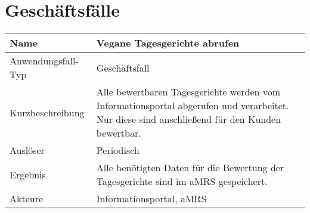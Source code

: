 \section{Geschäftsfälle}\label{sec:Geschaeftsfaelle}


\begin{table}[H]
    \centering
    \label{veganetagesgerichteabrufen}
    \begin{tabularx}{\textwidth}{| l | X |}
        \hline
        Name               & Vegane Tagesgerichte abrufen                                                                                                                  \\
        \hline
        Anwendungsfall-Typ & Geschäftsfall                                                                                                                                 \\
        \hline
        Kurzbeschreibung   & Alle bewertbaren Tagesgerichte werden vom Informationsportal abgerufen und verarbeitet. Nur diese sind anschließend für den Kunden bewertbar. \\
        \hline
        Auslöser           & Periodisch                                                                                                                                    \\
        \hline
        Ergebnis           & Alle benötigten Daten für die Bewertung der Tagesgerichte sind im aMRS gespeichert.                                                           \\
        \hline
        Akteure            & Informationsportal, \ac{aMRS}                                                                                                                 \\
        \hline
    \end{tabularx}
\end{table}


